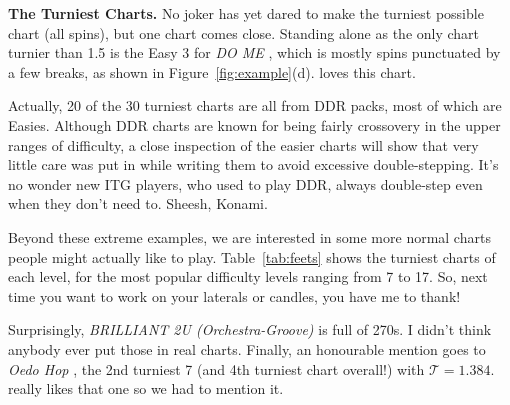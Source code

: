 \documentclass[10pt]{sigplanconf}
\begin{document}
{\bf The Turniest Charts.}
No joker has yet dared to make the turniest possible chart (all spins), but one chart comes close.
Standing alone as the only chart turnier than 1.5 is the Easy 3 for {\em DO ME} \cite{dome}, which is mostly spins punctuated by a few breaks, as shown in Figure~\ref{fig:example}(d).
\cite{alanv} loves this chart.

Actually, 20 of the 30 turniest charts are all from DDR packs, most of which are Easies. Although DDR charts are known for being fairly crossovery in the upper ranges of difficulty, a close inspection of the easier charts will show that very little care was put in while writing them to avoid excessive double-stepping.
It's no wonder new ITG players, who used to play DDR, always double-step even when they don't need to. Sheesh, Konami.

Beyond these extreme examples, we are interested in some more normal charts people might actually like to play.
Table~\ref{tab:feets} shows the turniest charts of each level, for the most popular difficulty levels ranging from 7 to 17.
So, next time you want to work on your laterals or candles, you have me to thank!

Surprisingly, {\em BRILLIANT 2U (Orchestra-Groove)} \cite{brilliant2u} is full of 270s. I didn't think anybody ever put those in real charts.
Finally, an honourable mention goes to {\em Oedo Hop} \cite{oedo}, the 2nd turniest 7 (and 4th turniest chart overall!) with $\mathcal{T}=1.384$.
\cite{deltax} really likes that one so we had to mention it.
\end{document}
